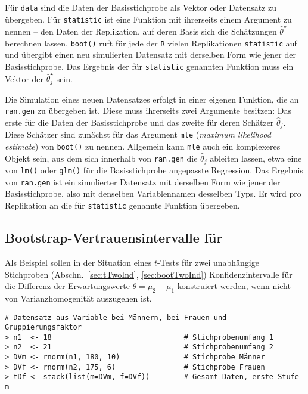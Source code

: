 Für \lstinline!data! sind die Daten der Basisstichprobe als Vektor oder Datensatz zu übergeben. Für \lstinline!statistic! ist eine Funktion mit ihrerseits einem Argument zu nennen -- den Daten der Replikation, auf deren Basis sich die Schätzungen $\hat{\theta}^{\star}$ berechnen lassen. \lstinline!boot()! ruft für jede der \lstinline!R! vielen Replikationen \lstinline!statistic! auf und übergibt einen neu simulierten Datensatz mit derselben Form wie jener der Basisstichprobe. Das Ergebnis der für \lstinline!statistic! genannten Funktion muss ein Vektor der $\hat{\theta}_{j}^{\star}$ sein.

Die Simulation eines neuen Datensatzes erfolgt in einer eigenen Funktion, die an \lstinline!ran.gen! zu übergeben ist. Diese muss ihrerseits zwei Argumente besitzen: Das erste für die Daten der Basisstichprobe und das zweite für deren Schätzer $\hat{\theta}_{j}$. Diese Schätzer sind zunächst für das Argument \lstinline!mle! (\emph{maximum likelihood estimate}) von \lstinline!boot()! zu nennen. Allgemein kann \lstinline!mle! auch ein komplexeres Objekt sein, aus dem sich innerhalb von \lstinline!ran.gen! die $\hat{\theta}_{j}$ ableiten lassen, etwa eine von \lstinline!lm()! oder \lstinline!glm()! für die Basisstichprobe angepasste Regression. Das Ergebnis von \lstinline!ran.gen! ist ein simulierter Datensatz mit derselben Form wie jener der Basisstichprobe, also mit denselben Variablennamen desselben Typs. Er wird pro Replikation an die für \lstinline!statistic! genannte Funktion übergeben.

\subsection[Bootstrap-Vertrauensintervalle für \texorpdfstring{$\mu_{2}-\mu_{1}$}{mu2-mu1}]{Bootstrap-Vertrauensintervalle für }
\label{sec:bootParamMu}

Als Beispiel sollen in der Situation eines $t$-Tests für zwei unabhängige Stichproben (Abschn.\ \ref{sec:tTwoInd}, \ref{sec:bootTwoInd}) Konfidenzintervalle für die Differenz der Erwartungswerte $\theta = \mu_{2}-\mu_{1}$ konstruiert werden, wenn nicht von Varianzhomogenität auszugehen ist.
\begin{lstlisting}
# Datensatz aus Variable bei Männern, bei Frauen und Gruppierungsfaktor
> n1  <- 18                               # Stichprobenumfang 1
> n2  <- 21                               # Stichprobenumfang 2
> DVm <- rnorm(n1, 180, 10)               # Stichprobe Männer
> DVf <- rnorm(n2, 175, 6)                # Stichprobe Frauen
> tDf <- stack(list(m=DVm, f=DVf))        # Gesamt-Daten, erste Stufe m
\end{lstlisting}

